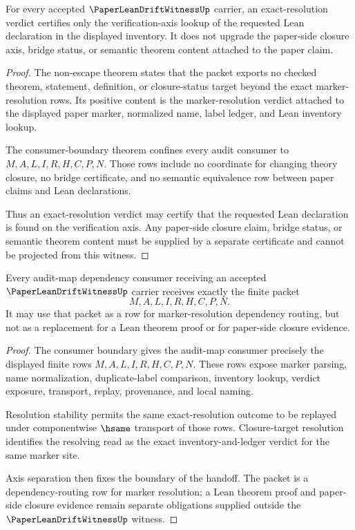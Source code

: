 \begin{theorem}
\label{thm:paper-lean-drift-witness-axis-separation}
For every accepted $\PaperLeanDriftWitnessUp$ carrier, an exact-resolution verdict certifies only the verification-axis lookup of the requested Lean declaration in the displayed inventory. It does not upgrade the paper-side closure axis, bridge status, or semantic theorem content attached to the paper claim.
\end{theorem}
\begin{proof}
The non-escape theorem states that the packet exports no checked theorem, statement, definition, or closure-status target beyond the exact marker-resolution rows. Its positive content is the marker-resolution verdict attached to the displayed paper marker, normalized name, label ledger, and Lean inventory lookup.

The consumer-boundary theorem confines every audit consumer to $M,A,L,I,R,H,C,P,N$. Those rows include no coordinate for changing theory closure, no bridge certificate, and no semantic equivalence row between paper claims and Lean declarations.

Thus an exact-resolution verdict may certify that the requested Lean declaration is found on the verification axis. Any paper-side closure claim, bridge status, or semantic theorem content must be supplied by a separate certificate and cannot be projected from this witness.
\end{proof}

\begin{theorem}
\label{thm:paper-lean-drift-witness-audit-map-handoff}
Every audit-map dependency consumer receiving an accepted $\PaperLeanDriftWitnessUp$ carrier receives exactly the finite packet
$$
M,A,L,I,R,H,C,P,N.
$$
It may use that packet as a row for marker-resolution dependency routing, but not as a replacement for a Lean theorem proof or for paper-side closure evidence.
\end{theorem}
\begin{proof}
The consumer boundary gives the audit-map consumer precisely the displayed finite rows $M,A,L,I,R,H,C,P,N$. These rows expose marker parsing, name normalization, duplicate-label comparison, inventory lookup, verdict exposure, transport, replay, provenance, and local naming.

Resolution stability permits the same exact-resolution outcome to be replayed under componentwise $\hsame$ transport of those rows. Closure-target resolution identifies the resolving read as the exact inventory-and-ledger verdict for the same marker site.

Axis separation then fixes the boundary of the handoff. The packet is a dependency-routing row for marker resolution; a Lean theorem proof and paper-side closure evidence remain separate obligations supplied outside the $\PaperLeanDriftWitnessUp$ witness.
\end{proof}

